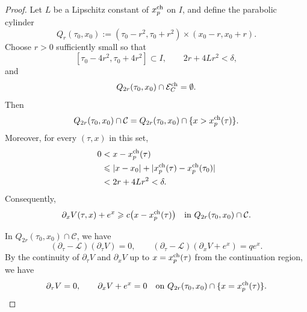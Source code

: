\documentclass[11pt, a4paper, leqno]{amsart}
\numberwithin{equation}{section}
\theoremstyle{plain}
\theoremstyle{definition}
\theoremstyle{remark}
\def\leq{\leqslant}
\def\geq{\geqslant}
\begin{document}
{\begin{proof}
Let $L$ be a Lipschitz constant of $x_p^{\rm ch}$ on $I$, and define
the parabolic cylinder
\[
    Q_r(\tau_0,x_0)
    :=
    (\tau_0-r^2,\tau_0+r^2)
    \times(x_0-r,x_0+r).
\]
Choose $r>0$ sufficiently small so that
\[
    [\tau_0-4r^2,\tau_0+4r^2]\subset I,
    \qquad
    2r+4Lr^2<\delta,
\]
and
\[
    Q_{2r}(\tau_0,x_0)\cap\mathcal E_C^{\rm ch}
    =\emptyset.
\]
Then
\[
    Q_{2r}(\tau_0,x_0)\cap\mathcal C
    =
    Q_{2r}(\tau_0,x_0)
    \cap
    \{x>x_p^{\rm ch}(\tau)\}.
\]
Moreover, for every $(\tau,x)$ in this set,
\[
\begin{aligned}
    0
    &<
    x-x_p^{\rm ch}(\tau) \\
    &\leq
    |x-x_0|
    +
    |x_p^{\rm ch}(\tau)-x_p^{\rm ch}(\tau_0)| \\
    &<
    2r+4Lr^2
    <\delta.
\end{aligned}
\]
Consequently,
\[
    \partial_xV(\tau,x)+e^x
    \geq
    c\bigl(x-x_p^{\rm ch}(\tau)\bigr)
    \quad\text{in }
    Q_{2r}(\tau_0,x_0)\cap\mathcal C.
\]

In $Q_{2r}(\tau_0,x_0)\cap\mathcal C$, we have
\[
    (\partial_\tau-\mathcal L)(\partial_\tau V)=0,
    \qquad
    (\partial_\tau-\mathcal L)(\partial_xV+e^x)=qe^x.
\]
By the continuity of $\partial_\tau V$ and $\partial_xV$ up to
$x=x_p^{\rm ch}(\tau)$ from the continuation region, we have
\[
    \partial_\tau V=0,
    \qquad
    \partial_xV+e^x=0
    \quad\text{on }
    Q_{2r}(\tau_0,x_0)
    \cap\{x=x_p^{\rm ch}(\tau)\}.
\]


\end{proof}}
\end{document}
